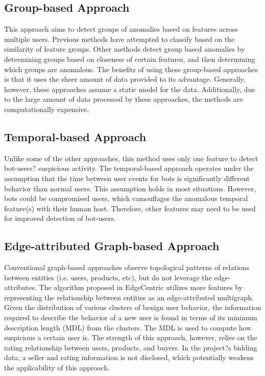 \documentclass{article} %
\begin{document}
\subsection{Group-based Approach}

This approach aims to detect groups of anomalies based on features across multiple users.
Previous methods have attempted to classify based on the similarity of feature groups. \cite{ndsync}
Other methods detect group based anomalies by determining groups based on closeness of certain features, and then determining which groups are anomalous. \cite{glad}
The benefits of using these group-based approaches is that it uses the sheer amount of data provided to its advantage.
Generally, however, these approaches assume a static model for the data.
Additionally, due to the large amount of data processed by these approaches, the methods are computationally expensive.

\subsection{Temporal-based Approach}

Unlike some of the other approaches, this method uses only one feature to detect bot-users? suspicious activity.
The temporal-based approach operates under the assumption that the time between user events for bots is significantly different behavior than normal users. \cite{birdnest} \cite{rsc} \cite{sfp} \cite{cicp}
This assumption holds in most situations.
However, bots could be compromised users, which camouflages the anomalous temporal feature(s) with their human host.
Therefore, other features may need to be used for improved detection of bot-users.

\subsection{Edge-attributed Graph-based Approach}

Conventional graph-based approaches observe topological patterns of relations between entities (i.e. users, products, etc), but do not leverage the edge-attributes.
The algorithm proposed in EdgeCentric utilizes more features by representing the relationship between entities as an edge-attributed multigraph. \cite{edgecentric}
Given the distribution of various clusters of benign user behavior, the information required to describe the behavior of a new user is found in terms of its minimum description length (MDL) from the clusters.
The MDL is used to compute how suspicious a certain user is.
The strength of this approach, however, relies on the rating relationship between users, products, and buyers.
In the project?s bidding data, a seller and rating information is not disclosed, which potentially weakens the applicability of this approach.
\end{document}
